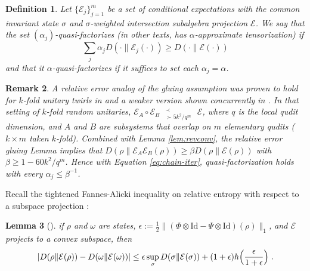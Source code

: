 \documentclass[11pt,reqno]{amsart}
\newtheorem{lemma}{Lemma}[section]
\newtheorem{rem}[lemma]{Remark}
\newtheorem{definition}[lemma]{Definition}
\newtheorem{assump}[lemma]{Assumption}
\newcommand{\NN}{\mathbb{N}}
\newcommand{\E}{\mathcal{E}}
\newcommand{\Id}{\mathrm{Id}}
\newcommand{\pl}{\hspace{.1cm}}
\newcommand{\precsucc}[2]{\text{ } {}^{\prec {#2}}_{\succ {#1}} \text{ } }
\begin{document}
\begin{definition} \label{def:quasifactorization}
    Let $\{\E_j\}_{j=1}^m$ be a set of conditional expectations with the common invariant state $\sigma$ and $\sigma$-weighted intersection subalgebra projection $\E$. We say that the set $(\alpha_j)$-quasi-factorizes (in other texts, has $\alpha$-approximate tensorization) if
    \begin{equation}
        \sum_j \alpha_j D(\cdot \| \E_j(\cdot)) \geq D(\cdot \| \E(\cdot))
    \end{equation}
    and that it $\alpha$-quasi-factorizes if it suffices to set each $\alpha_j = \alpha$.
\end{definition}
\begin{rem} \normalfont \label{rem:glue}
    A relative error analog of the gluing assumption was proven to hold for $k$-fold unitary twirls in \cite[Lemma 8]{schuster_random_2025} and a weaker version shown concurrently in \cite{laracuente_approximate_2026}. In that setting of $k$-fold random unitaries, $\E_{A} \circ \E_B \precsucc{5 k^2 / q^m}{} \E$, where $q$ is the local qudit dimension, and $A$ and $B$ are subsystems that overlap on $m$ elementary qudits ($k \times m$ taken $k$-fold). Combined with Lemma \ref{lem:revconv}, the relative error gluing Lemma implies that $D(\rho \| \E_A \E_B (\rho)) \geq \beta D(\rho \| \E(\rho)) $ with $\beta \geq 1 - 60 k^2 / q^m$. Hence with Equation \eqref{eq:chain-iter}, quasi-factorization holds with every $\alpha_j \leq \beta^{-1}$.
\end{rem}

Recall the tightened Fannes-Alicki inequality on relative entropy with respect to a subspace projection \cite[Lemma 7]{winter_tight_2016}:
\begin{lemma}[] \label{lem:wsb}
    if $\rho$ and $\omega$ are states, $\epsilon := \frac{1}{2} \| (\Phi \otimes \Id - \Psi \otimes \Id)(\rho) \|_1$, and $\E$ projects to a convex subspace, then
    \begin{equation} \label{eq:wsb}
        |D(\rho \| \E(\rho)) - D(\omega \| \E(\omega))|
            \leq \epsilon \sup_{\sigma} D(\sigma \| \E(\sigma)) + (1+\epsilon) h \Big ( \frac{\epsilon}{1+\epsilon} \Big ) \pl.
    \end{equation}
\end{lemma}
\end{document}
